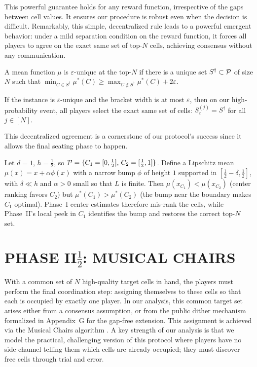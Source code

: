 This powerful guarantee holds for any reward function, irrespective of the gaps between cell values. It ensures our procedure is robust even when the decision is difficult. Remarkably, this simple, decentralized rule leads to a powerful emergent behavior: under a mild separation condition on the reward function, it forces all players to agree on the exact same set of top-$N$ cells, achieving consensus without any communication.

\begin{definition}
\label{def:eps-uniq}
A mean function $\mu$ is $\varepsilon$-unique at the top-$N$ if there is a unique set $S^\dagger \subset \mathcal{P}$ of size $N$ such that $\min_{C\in S^\dagger} \mu^\ast(C) \ge \max_{C\notin S^\dagger} \mu^\ast(C) + 2\varepsilon$.
\end{definition}

\begin{lemma}\label{lem:consensus}
If the instance is $\varepsilon$-unique and the bracket width is at most $\varepsilon$, then on our high-probability event, all players select the exact same set of cells: $S^{(j)}_\varepsilon = S^\dagger$ for all $j \in [N]$.
\end{lemma}

This decentralized agreement is a cornerstone of our protocol's success since it allows the final seating phase to happen.

\begin{example}\label{ex:center-failure}
Let $d=1$, $h=\tfrac12$, so $\mathcal{P}=\{C_1=[0,\tfrac12],\,C_2=[\tfrac12,1]\}$.
Define a Lipschitz mean $\mu(x)=x+\alpha \phi(x)$ with a narrow bump $\phi$ of height $1$ supported in $[\tfrac12-\delta,\tfrac12]$, with $\delta\ll h$ and $\alpha>0$ small so that $L$ is finite.
Then $\mu(x_{C_1})<\mu(x_{C_2})$ (center ranking favors $C_2$) but $\mu^\ast(C_1)>\mu^\ast(C_2)$ (the bump near the boundary makes $C_1$ optimal).
Phase~I center estimates therefore mis-rank the cells, while Phase~II's local peek in $C_1$ identifies the bump and restores the correct top-$N$ set.
\end{example}

\section{PHASE II\texorpdfstring{$\tfrac{1}{2}$}{1/2}: MUSICAL CHAIRS}
\label{sec:phase2half}

With a common set of $N$ high-quality target cells in hand, the players must perform the final coordination step: assigning themselves to these cells so that each is occupied by exactly one player. In our analysis, this common target set arises either from a consensus assumption, or from the public dither mechanism formalized in Appendix~G for the gap-free extension. This assignment is achieved via the Musical Chairs algorithm \citep{rosenski2016multi}. A key strength of our analysis is that we model the practical, challenging version of this protocol where players have no side-channel telling them which cells are already occupied; they must discover free cells through trial and error.

